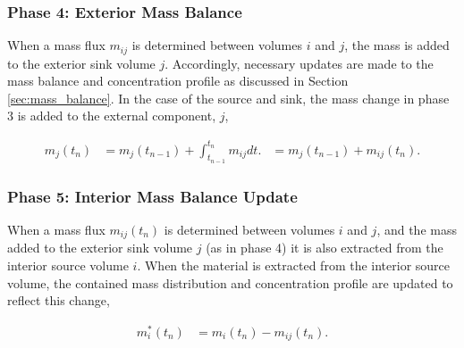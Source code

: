 \subsubsection{Phase 4: Exterior Mass Balance}

When a mass flux $m_{ij}$ is determined between volumes $i$ and $j$, the
mass is added to the exterior sink volume $j$. Accordingly, necessary updates
are made to the mass balance and concentration profile as discussed in Section
\ref{sec:mass_balance}. In the case of the source and sink, the mass change in
phase 3 is added to the external component, $j$,

\begin{align}
        m_j(t_n) &= m_j(t_{n-1}) + \int_{t_{n-1}}^{t_n}m_{ij}dt.
                 &= m_j(t_{n-1}) + m_{ij}(t_n).
\end{align}

\subsubsection{Phase 5: Interior Mass Balance Update}

When a mass flux $m_{ij}(t_n)$ is determined between volumes $i$ and $j$, and
the mass added to the exterior sink volume $j$ (as in phase 4) it is also
extracted from the interior source volume $i$.  When the material is extracted
from the interior source volume, the contained mass distribution and
concentration profile are updated to reflect this change,

\begin{align}
  m_{i}^*(t_n) &= m_i(t_n) - m_{ij}(t_n).
\end{align}

